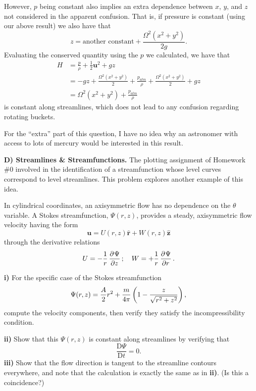 \documentclass{article}
\def\*#1{\mathbf{#1}}
\newcommand{\dadvd}[2]{\dfrac{\text{D} #1}{\text{D} #2}} %
\newcommand{\rhat}{\mathbf{\hat{r}}}
\newcommand{\zhat}{\mathbf{\hat{z}}}
\begin{document}
However, $p$ being constant also implies an extra dependence between
$x$, $y$, and $z$ not considered in the apparent confusion. That is, if
pressure is constant (using our above result) we also have that
%
\begin{equation*}
    z = \text{another constant} + \frac{\Omega^2 (x^2 + y^2)}{2 g}
    .
\end{equation*}
%
Evaluating the conserved quantity using the $p$ we calculated, we have
that
%
\begin{align*}
    H &= \frac{p}{\rho} + \frac{1}{2} \*u^2 + g z \\
      &= - g z + \frac{\Omega^2 (x^2 + y^2)}{2} + \frac{p_{atm}}{\rho}
        + \frac{\Omega^2 (x^2 + y^2)}{2} + g z \\
      &= \Omega^2 (x^2 + y^2) + \frac{p_{atm}}{\rho}
\end{align*}
%
is constant along streamlines, which does not lead to any confusion
regarding rotating buckets.

For the ``extra'' part of this question, I have no idea why an
astronomer with access to lots of mercury would be interested in this
result.

\newpage

\textbf{D) Streamlines \& Streamfunctions.}
The plotting assignment of Homework \#0 involved in the identification
of a streamfunction whose level curves correspond to level streamlines.
This problem explores another example of this idea.

In cylindrical coordinates, an axisymmetric flow has no dependence on
the $\theta$ variable. A Stokes streamfunction, $\Psi(r, z)$, provides a
steady, axisymmetric flow velocity having the form
%
\begin{equation*}
    \*u = U(r, z) \rhat + W(r, z) \zhat
\end{equation*}
%
through the derivative relations
%
\begin{equation*}
    U = - \frac{1}{r} \dpd{\Psi}{z}; \quad W = + \frac{1}{r} \dpd{\Psi}{r}
    .
\end{equation*}

\textbf{i)} For the specific case of the Stokes streamfunction
%
\begin{equation*}
    \Psi(r, z) = \frac{A}{2} r^2 + \frac{m}{4 \pi} \del{1 - \frac{z}{\sqrt{r^2 + z^2}}}
    ,
\end{equation*}
%
compute the velocity components, then verify they satisfy the
incompressibility condition.

\textbf{ii)} Show that this $\Psi(r, z)$ is constant along streamlines
by verifying that
%
\begin{equation*}
    \dadvd{\Psi}{t} = 0
    .
\end{equation*}
%
\textbf{iii)} Show that the flow direction is tangent to the streamline
contours everywhere, and note that the calculation is exactly the same
as in \textbf{ii)}. (Is this a coincidence?)
\end{document}
